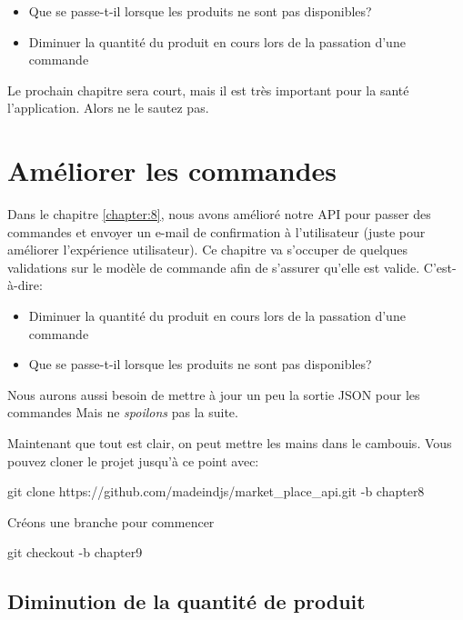 \documentclass[]{report}
\begin{document}
   \begin{itemize}
     \item Que se passe-t-il lorsque les produits ne sont pas disponibles?
     \item Diminuer la quantité du produit en cours lors de la passation d'une commande
   \end{itemize}

   Le prochain chapitre sera court, mais il est très important pour la santé l'application. Alors ne le sautez pas.

\chapter{Améliorer les commandes}\label{chapter:9}

  Dans le chapitre \ref{chapter:8}, nous avons amélioré notre API pour passer des commandes et envoyer un e-mail de confirmation à l'utilisateur (juste pour améliorer l'expérience utilisateur). Ce chapitre va s'occuper de quelques validations sur le modèle de commande afin de s'assurer qu'elle est valide. C'est-à-dire:

  \begin{itemize}
    \item Diminuer la quantité du produit en cours lors de la passation d'une commande
    \item Que se passe-t-il lorsque les produits ne sont pas disponibles?
  \end{itemize}

  Nous aurons aussi besoin de mettre à jour un peu la sortie JSON pour les commandes Mais ne \textit{spoilons} pas la suite.

  Maintenant que tout est clair, on peut mettre les mains dans le cambouis. Vous pouvez cloner le projet jusqu'à ce point avec:

  \begin{bashcode}
  git clone https://github.com/madeindjs/market_place_api.git -b chapter8
  \end{bashcode}

  Créons une branche pour commencer

  \begin{bashcode}
  git checkout -b chapter9
  \end{bashcode}

  \section{Diminution de la quantité de produit}
\end{document}
